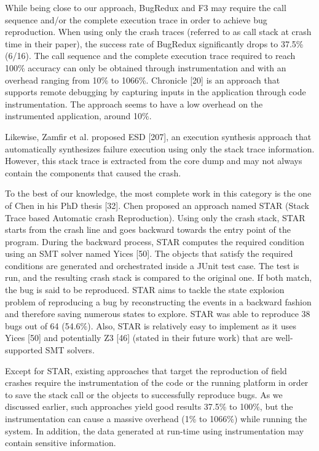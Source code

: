 \documentclass[12pt]{report}
\begin{document}
While being close to our approach, BugRedux and F3 may require the call
sequence and/or the complete execution trace in order to achieve bug
reproduction. When using only the crash traces (referred to as call
stack at crash time in their paper), the success rate of BugRedux
significantly drops to 37.5\% (6/16). The call sequence and the complete
execution trace required to reach 100\% accuracy can only be obtained
through instrumentation and with an overhead ranging from 10\% to
1066\%. Chronicle {[}20{]} is an approach that supports remote debugging
by capturing inputs in the application through code instrumentation. The
approach seems to have a low overhead on the instrumented application,
around 10\%.

Likewise, Zamfir et al. proposed ESD {[}207{]}, an execution synthesis
approach that automatically synthesizes failure execution using only the
stack trace information. However, this stack trace is extracted from the
core dump and may not always contain the components that caused the
crash.

To the best of our knowledge, the most complete work in this category is
the one of Chen in his PhD thesis {[}32{]}. Chen proposed an approach
named STAR (Stack Trace based Automatic crash Reproduction). Using only
the crash stack, STAR starts from the crash line and goes backward
towards the entry point of the program. During the backward process,
STAR computes the required condition using an SMT solver named Yices
{[}50{]}. The objects that satisfy the required conditions are generated
and orchestrated inside a JUnit test case. The test is run, and the
resulting crash stack is compared to the original one. If both match,
the bug is said to be reproduced. STAR aims to tackle the state
explosion problem of reproducing a bug by reconstructing the events in a
backward fashion and therefore saving numerous states to explore. STAR
was able to reproduce 38 bugs out of 64 (54.6\%). Also, STAR is
relatively easy to implement as it uses Yices {[}50{]} and potentially
Z3 {[}46{]} (stated in their future work) that are well-supported SMT
solvers.

Except for STAR, existing approaches that target the reproduction of
field crashes require the instrumentation of the code or the running
platform in order to save the stack call or the objects to successfully
reproduce bugs. As we discussed earlier, such approaches yield good
results 37.5\% to 100\%, but the instrumentation can cause a massive
overhead (1\% to 1066\%) while running the system. In addition, the data
generated at run-time using instrumentation may contain sensitive
information.
\end{document}
